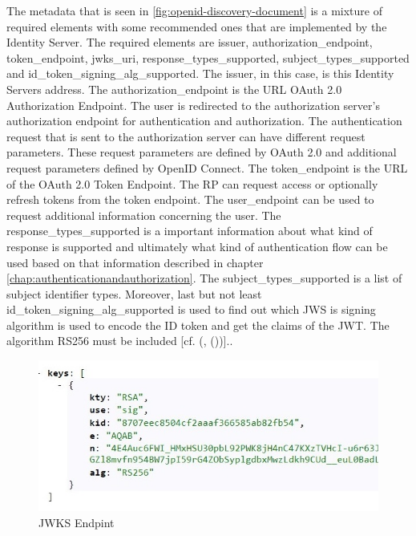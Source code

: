 The metadata that is seen in \ref{fig:openid-discovery-document} is a mixture of required elements with some recommended ones that are implemented by the Identity Server. The required elements are issuer, authorization\_endpoint, token\_endpoint, jwks\_uri, response\_types\_supported, subject\_types\_supported and id\_token\_signing\_alg\_supported. The issuer, in this case, is this Identity Servers address. The authorization\_endpoint is the URL OAuth 2.0 Authorization Endpoint. The user is redirected to the authorization server's authorization endpoint for authentication and authorization. The authentication request that is sent to the authorization server can have different request parameters. These request parameters are defined by OAuth 2.0 and additional request parameters defined by OpenID Connect. The token\_endpoint is the URL of the OAuth 2.0 Token Endpoint. The RP can request access or optionally refresh tokens from the token endpoint. The user\_endpoint can be used to request additional information concerning the user. The response\_types\_supported is a important information about what kind of response is supported and ultimately what kind of authentication flow can be used based on that information described in chapter \ref{chap:authenticationandauthorization}. The subject\_types\_supported is a list of subject identifier types. Moreover, last but not least id\_token\_signing\_alg\_supported is used to find out which JWS is signing algorithm is used to encode the ID token and get the claims of the JWT. The algorithm RS256 must be included [cf. (\cite{Sakimura:OIDCC}, (\cite{Sakimura:OIDCD}))].. 

\begin{figure}[h]
	\centering
	\includegraphics[width=0.7\linewidth]{images/jwkDiscovoryDocument}
	\caption{JWKS Endpint}
	\label{fig:jwkdiscovorydocument}
\end{figure}

